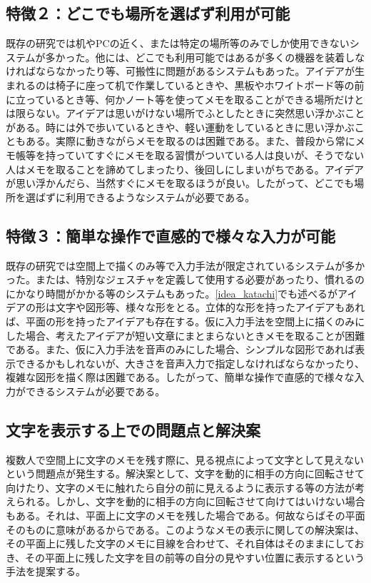 \documentclass[11pt,a4j, titlepage]{jarticle} %
\begin{document}
\subsection*{特徴２：どこでも場所を選ばず利用が可能}
既存の研究では机やPCの近く、または特定の場所等のみでしか使用できないシステムが多かった。他には、どこでも利用可能ではあるが多くの機器を装着しなければならなかったり等、可搬性に問題があるシステムもあった。アイデアが生まれるのは椅子に座って机で作業しているときや、黒板やホワイトボード等の前に立っているとき等、何かノート等を使ってメモを取ることができる場所だけとは限らない。アイデアは思いがけない場所でふとしたときに突然思い浮かぶことがある。時には外で歩いているときや、軽い運動をしているときに思い浮かぶこともある。実際に動きながらメモを取るのは困難である。また、普段から常にメモ帳等を持っていてすぐにメモを取る習慣がついている人は良いが、そうでない人はメモを取ることを諦めてしまったり、後回しにしまいがちである。アイデアが思い浮かんだら、当然すぐにメモを取るほうが良い。したがって、どこでも場所を選ばずに利用できるようなシステムが必要である。

\subsection*{特徴３：簡単な操作で直感的で様々な入力が可能}
既存の研究では空間上で描くのみ等で入力手法が限定されているシステムが多かった。または、特別なジェスチャを定義して使用する必要があったり、慣れるのにかなり時間がかかる等のシステムもあった。\ref{idea_katachi}でも述べるがアイデアの形は文字や図形等、様々な形をとる。立体的な形を持ったアイデアもあれば、平面の形を持ったアイデアも存在する。仮に入力手法を空間上に描くのみにした場合、考えたアイデアが短い文章にまとまらないときメモを取ることが困難である。また、仮に入力手法を音声のみにした場合、シンプルな図形であれば表示できるかもしれないが、大きさを音声入力で指定しなければならなかったり、複雑な図形を描く際は困難である。したがって、簡単な操作で直感的で様々な入力ができるシステムが必要である。

\subsection{文字を表示する上での問題点と解決案} \label{moji_mondai}
複数人で空間上に文字のメモを残す際に、見る視点によって文字として見えないという問題点が発生する。解決案として、文字を動的に相手の方向に回転させて向けたり、文字のメモに触れたら自分の前に見えるように表示する等の方法が考えられる。しかし、文字を動的に相手の方向に回転させて向けてはいけない場合もある。それは、平面上に文字のメモを残した場合である。何故ならばその平面そのものに意味があるからである。このようなメモの表示に関しての解決案は、その平面上に残した文字のメモに目線を合わせて、それ自体はそのままにしておき、その平面上に残した文字を目の前等の自分の見やすい位置に表示するという手法を提案する。
\end{document}
